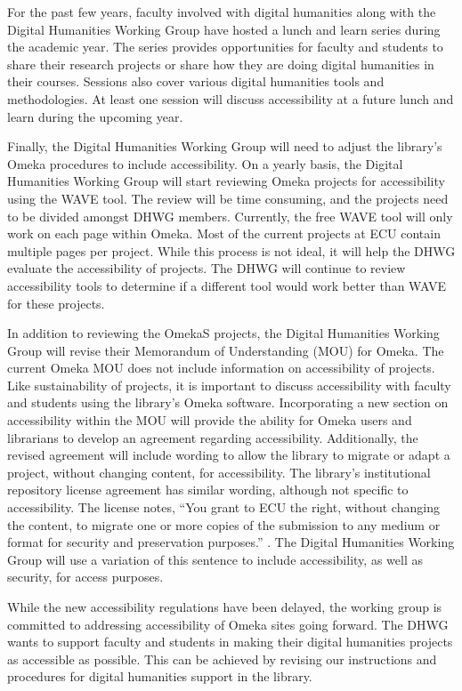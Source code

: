 \documentclass[final]{anthology-ch}
\begin{document}
For the past few years, faculty involved with digital humanities along with the Digital Humanities Working Group have hosted a lunch and learn series during the academic year. The series provides opportunities for faculty and students to share their research projects or share how they are doing digital humanities in their courses. Sessions also cover various digital humanities tools and methodologies. At least one session will discuss accessibility at a future lunch and learn during the upcoming year.

Finally, the Digital Humanities Working Group will need to adjust the library's Omeka procedures to include accessibility. On a yearly basis, the Digital Humanities Working Group will start reviewing Omeka projects for accessibility using the WAVE tool. The review will be time consuming, and the projects need to be divided amongst DHWG members. Currently, the free WAVE tool will only work on each page within Omeka. Most of the current projects at ECU contain multiple pages per project. While this process is not ideal, it will help the DHWG evaluate the accessibility of projects. The DHWG will continue to review accessibility tools to determine if a different tool would work better than WAVE for these projects.

In addition to reviewing the OmekaS projects, the Digital Humanities Working Group will revise their Memorandum of Understanding (MOU) for Omeka. The current Omeka MOU does not include information on accessibility of projects. Like sustainability of projects, it is important to discuss accessibility with faculty and students using the library's Omeka software. Incorporating a new section on accessibility within the MOU will provide the ability for Omeka users and librarians to develop an agreement regarding accessibility. Additionally, the revised agreement will include wording to allow the library to migrate or adapt a project, without changing content, for accessibility. The library's institutional repository license agreement has similar wording, although not specific to accessibility. The license notes, \enquote{You grant to ECU the right, without changing the content, to migrate one or more copies of the submission to any medium or format for security and preservation purposes.} \cite{ecuscholarship}. The Digital Humanities Working Group will use a variation of this sentence to include accessibility, as well as security, for access purposes.

While the new accessibility regulations have been delayed, the working group is committed to addressing accessibility of Omeka sites going forward. The DHWG wants to support faculty and students in making their digital humanities projects as accessible as possible. This can be achieved by revising our instructions and procedures for digital humanities support in the library.
\end{document}
